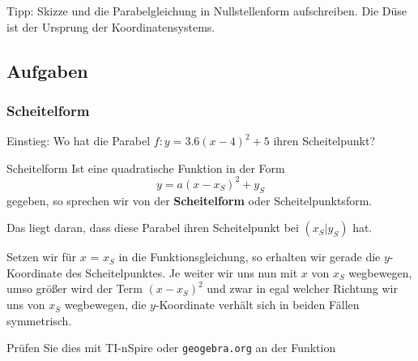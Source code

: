 Tipp: Skizze und  die Parabelgleichung in Nullstellenform aufschreiben. Die Düse ist der Ursprung der Koordinatensystems.\\



\subsection*{Aufgaben}%
\newpage

\subsubsection{Scheitelform}
Einstieg: Wo hat die Parabel $f: y=3.6(x-4)^2 + 5$ ihren
Scheitelpunkt?


\begin{gesetz}{Scheitelform}{}
  Ist eine quadratische Funktion in der Form
$$y = a(x-x_S)^2 + y_S$$
gegeben, so sprechen wir von der \textbf{Scheitelform} oder Scheitelpunktsform.
\end{gesetz}

Das liegt daran, dass diese Parabel ihren Scheitelpunkt bei
$(x_S|y_S)$ hat.

Setzen wir für $x$ = $x_S$ in die Funktionsgleichung, so erhalten wir
gerade die $y$-Koordinate des Scheitelpunktes. Je weiter wir uns nun
mit $x$ von $x_S$ wegbewegen, umso größer wird der Term $(x-x_S)^2$
und zwar in egal welcher Richtung wir uns von $x_S$ wegbewegen, die
$y$-Koordinate verhält sich in beiden Fällen symmetrisch.

Prüfen Sie dies mit TI-nSpire oder \texttt{geogebra.org} an der Funktion

